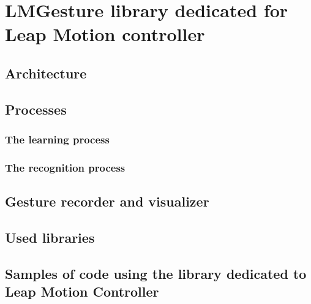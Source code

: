 \chapter{LMGesture library dedicated for Leap Motion controller}

\section{Architecture}

\section{Processes}

\subsection{The learning process}

\subsection{The recognition process}

\section{Gesture recorder and visualizer}

\section{Used libraries}

\section{Samples of code using the library dedicated to Leap Motion Controller}
